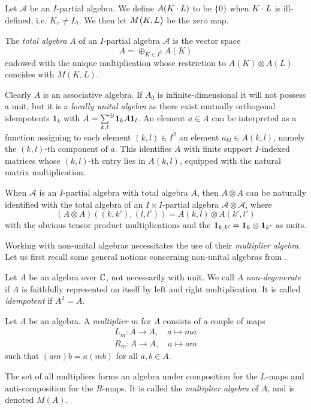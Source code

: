 Let $\mathscr{A}$ be an $I$-partial algebra. We define $A(K\cdot L)$ to be $\{0\}$ when $K\cdot L$ is ill-defined, i.e. $K_r\neq L_l$. We then let $M{\begin{pmatrix} K, L\end{pmatrix}}$ be the zero map.

\begin{Def} The \emph{total algebra} $A$ of an $I$-partial algebra $\mathscr{A}$ is the vector space \[A = \oplus_{K\in I^2} A(K)\] endowed with the unique multiplication whose restriction to $A(K)\otimes A(L)$ concides with $M(K,L)$. 
\end{Def} 
Clearly $A$ is an associative algebra. If $A_0$ is infinite-dimensional it will not possess a unit, but it is a \emph{locally unital algebra} as there exist mutually orthogonal idempotents $\mathbf{1}_k$ with $A = \underset{k,l}{\sum}^{\oplus} \mathbf{1}_kA\mathbf{1}_l$. An element $a\in A$ can be interpreted as a function assigning to each element $(k,l)\in I^2$ an element $a_{kl}\in A(k,l)$, namely the $(k,l)$-th component of $a$. This identifies $A$ with finite support $I$-indexed matrices whose $(k,l)$-th entry lies in $A(k,l)$, equipped with the natural matrix multiplication. 

\begin{Rem}\label{RemGrad} When $\mathscr{A}$ is an $I$-partial algebra with total algebra $A$, then $A\otimes A$ can be naturally identified with the total algebra of an $I\times I$-partial algebra $\mathscr{A}\otimes \mathscr{A}$, where \[(A\otimes A)((k,k'),(l,l')) = A(k,l)\otimes A(k',l')\] with the obvious tensor product multiplications and the $\mathbf{1}_{k,k'} = \mathbf{1}_k\otimes \mathbf{1}_{k'}$ as units. 
\end{Rem}

Working with non-unital algebras necessitates the use of their \emph{multiplier algebra}. Let us first recall some general notions concerning non-unital algebras from \cite{Dau1,VDae1}.

\begin{Def} Let $A$ be an algebra over $\mathbb{C}$, not necessarily with unit. We call $A$ \emph{non-degenerate} if $A$ is faithfully represented on itself by left and right multiplication. It is called \emph{idempotent} if $A^2 = A$. 
\end{Def}

\begin{Def} Let $A$ be an algebra. A \emph{multiplier} $m$ for $A$ consists of a couple of maps \begin{eqnarray*} L_m:A\rightarrow A,\quad a\mapsto ma\\ R_m:A\rightarrow A,\quad a\mapsto am\end{eqnarray*} such that $(am)b = a(mb)$ for all $a,b\in A$. 

The set of all multipliers forms an algebra under composition for the $L$-maps and anti-composition for the $R$-maps. It is called the \emph{multiplier algebra} of $A$, and is denoted $M(A)$.
\end{Def}


